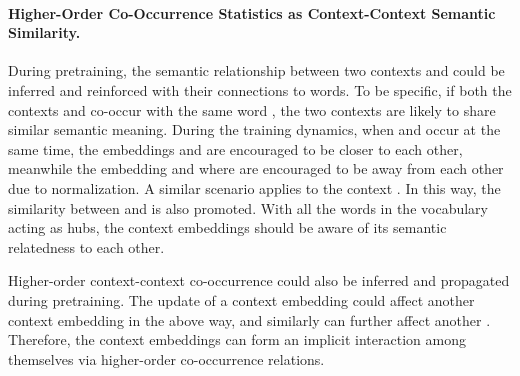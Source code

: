 \documentclass[11pt,a4paper]{article}
\begin{document}
\paragraph{Higher-Order Co-Occurrence Statistics as Context-Context Semantic Similarity.}
During pretraining, the semantic relationship between two contexts  and  could be inferred and reinforced with their connections to words. To be specific, if both the contexts  and  co-occur with the same word , the two contexts are likely to share similar semantic meaning. During the training dynamics, when  and  occur at the same time, the embeddings  and  are encouraged to be closer to each other, meanwhile the embedding  and  where  are encouraged to be away from each other due to normalization. A similar scenario applies to the context . In this way, the similarity between  and  is also promoted. With all the words in the vocabulary acting as hubs, the context embeddings should be aware of its semantic relatedness to each other. 

Higher-order context-context co-occurrence could also be inferred and propagated during pretraining. The update of a context embedding  could affect another context embedding  in the above way, and similarly  can further affect another . Therefore, the context embeddings can form an implicit interaction among themselves via higher-order co-occurrence relations.

\begin{table*}[!h]
\centering
{}
\caption{\label{tab:wordfreq} The mean -norm, as well as their distance to their -nearest neighbors (among all the word embeddings) of the word embeddings of BERT, segmented by ranges of word frequency rank (counted based on Wikipedia dump; the smaller the more frequent).  }


\vspace{-10pt}
\end{table*}
\end{document}
